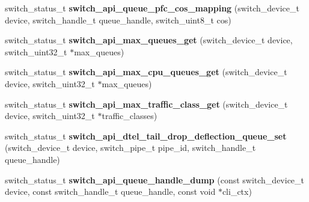 \begin{DoxyCompactItemize}
\item 
\hypertarget{group__QUEUE_gad157cb892d128b0fc9e04fbaaea7ecd7}{switch\+\_\+status\+\_\+t {\bfseries switch\+\_\+api\+\_\+queue\+\_\+pfc\+\_\+cos\+\_\+mapping} (switch\+\_\+device\+\_\+t device, switch\+\_\+handle\+\_\+t queue\+\_\+handle, switch\+\_\+uint8\+\_\+t cos)}\label{group__QUEUE_gad157cb892d128b0fc9e04fbaaea7ecd7}

\item 
\hypertarget{group__QUEUE_ga1cf2a824ff139b103509773518c9b9c7}{switch\+\_\+status\+\_\+t {\bfseries switch\+\_\+api\+\_\+max\+\_\+queues\+\_\+get} (switch\+\_\+device\+\_\+t device, switch\+\_\+uint32\+\_\+t $\ast$max\+\_\+queues)}\label{group__QUEUE_ga1cf2a824ff139b103509773518c9b9c7}

\item 
\hypertarget{group__QUEUE_gaea2e800e95079139db42f99d2cedbb5a}{switch\+\_\+status\+\_\+t {\bfseries switch\+\_\+api\+\_\+max\+\_\+cpu\+\_\+queues\+\_\+get} (switch\+\_\+device\+\_\+t device, switch\+\_\+uint32\+\_\+t $\ast$max\+\_\+queues)}\label{group__QUEUE_gaea2e800e95079139db42f99d2cedbb5a}

\item 
\hypertarget{group__QUEUE_ga6db6e93da25446f14fcfc4a347de3ed6}{switch\+\_\+status\+\_\+t {\bfseries switch\+\_\+api\+\_\+max\+\_\+traffic\+\_\+class\+\_\+get} (switch\+\_\+device\+\_\+t device, switch\+\_\+uint32\+\_\+t $\ast$traffic\+\_\+classes)}\label{group__QUEUE_ga6db6e93da25446f14fcfc4a347de3ed6}

\item 
\hypertarget{group__QUEUE_gac9f2f5c1aa4aa6c44ef096ca5df84216}{switch\+\_\+status\+\_\+t {\bfseries switch\+\_\+api\+\_\+dtel\+\_\+tail\+\_\+drop\+\_\+deflection\+\_\+queue\+\_\+set} (switch\+\_\+device\+\_\+t device, switch\+\_\+pipe\+\_\+t pipe\+\_\+id, switch\+\_\+handle\+\_\+t queue\+\_\+handle)}\label{group__QUEUE_gac9f2f5c1aa4aa6c44ef096ca5df84216}

\item 
\hypertarget{group__QUEUE_ga897bea7fd87bcd3e80eceec1d90a853d}{switch\+\_\+status\+\_\+t {\bfseries switch\+\_\+api\+\_\+queue\+\_\+handle\+\_\+dump} (const switch\+\_\+device\+\_\+t device, const switch\+\_\+handle\+\_\+t queue\+\_\+handle, const void $\ast$cli\+\_\+ctx)}\label{group__QUEUE_ga897bea7fd87bcd3e80eceec1d90a853d}


\end{DoxyCompactItemize}
